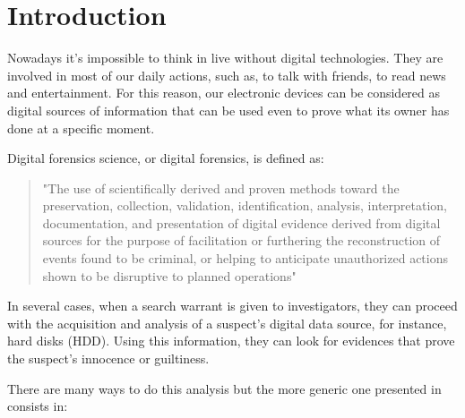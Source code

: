 \cleardoublepage
{}
\chapter*{Introduction}

Nowadays it's impossible to think in live without digital technologies. They
are involved in most of our daily actions, such as, to talk with friends, to
read news and entertainment. For this reason, our electronic devices can be
considered as digital sources of information that can be used even to prove
what its owner has done at a specific moment.

Digital forensics science, or digital forensics, is defined as:

\begin{quote}
"The use of scientifically derived and proven methods toward the preservation,
collection, validation, identification, analysis, interpretation,
documentation, and presentation of digital evidence derived from digital
sources for the purpose of facilitation or furthering the reconstruction of
events found to be criminal, or helping to anticipate unauthorized actions
shown to be disruptive to planned operations" \cite{DFRWS-df-road-map}
\end{quote}

In several cases, when a search warrant is given to investigators, they can
proceed with the acquisition and analysis of a suspect's digital data source,
for instance, hard disks (HDD). Using this information, they can look for
evidences that prove the suspect's innocence or guiltiness.

There are many ways to do this analysis but the more generic one presented in
\cite{ds-phases} consists in:

